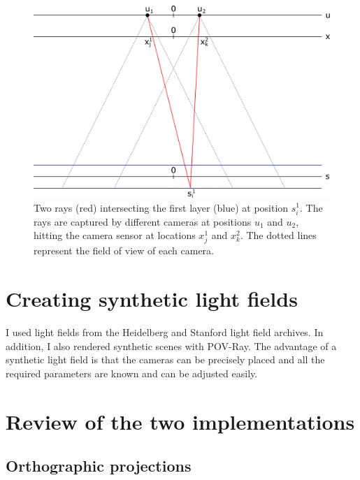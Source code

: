 \documentclass[11pt,a4paper,titlepage]{article}
\begin{document}
\begin{figure}[h]
	\centering
	\includegraphics[scale=0.5]{sketches/camera_layers_sketch.png} 
	\caption{Two rays (red) intersecting the first layer (blue) at position $s_i^1$. The rays are captured by different cameras at positions $u_1$ and $u_2$, hitting the camera sensor at locations $x_j^1$ and $x_k^2$. The dotted lines represent the field of view of each camera.}
	\label{fig:cameras_layers_sketch}
\end{figure}

\section{Creating synthetic light fields}
I used light fields from the Heidelberg and Stanford light field archives. In addition, I also rendered synthetic scenes with POV-Ray. The advantage of a synthetic light field is that the cameras can be precisely placed and all the required parameters are known and can be adjusted easily. 

\newpage
\section{Review of the two implementations}
\subsection{Orthographic projections}
\end{document}
